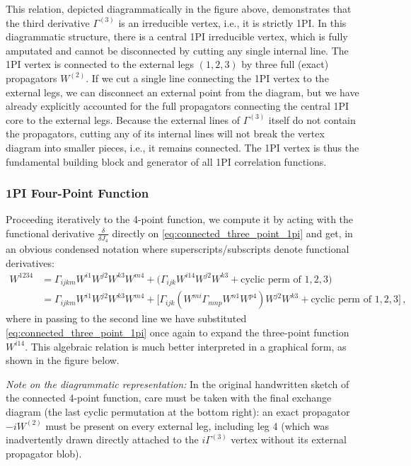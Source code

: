 This relation, depicted diagrammatically in the figure above, demonstrates that the third derivative \(\Gamma^{(3)}\) is an irreducible vertex, i.e., it is strictly 1PI. In this diagrammatic structure, there is a central 1PI irreducible vertex, which is fully amputated and cannot be disconnected by cutting any single internal line. The 1PI vertex is connected to the external legs \((1, 2, 3)\) by three full (exact) propagators \(W^{(2)}\). If we cut a single line connecting the 1PI vertex to the external legs, we can disconnect an external point from the diagram, but we have already explicitly accounted for the full propagators connecting the central 1PI core to the external legs. Because the external lines of \(\Gamma^{(3)}\) itself do not contain the propagators, cutting any of its internal lines will not break the vertex diagram into smaller pieces, i.e., it remains connected. The 1PI vertex is thus the fundamental building block and generator of all 1PI correlation functions.

\subsubsection{1PI Four-Point Function}

Proceeding iteratively to the 4-point function, we compute it by acting with the functional derivative \(\frac{\delta}{\delta J_4}\) directly on \eqref{eq:connected_three_point_1pi} and get, in an obvious condensed notation where superscripts/subscripts denote functional derivatives:
\[
    \begin{aligned}
        W^{1234} & = \Gamma_{ijkm} W^{i1} W^{j2} W^{k3} W^{m4} + \Big( \Gamma_{ijk} W^{i14} W^{j2} W^{k3} + \text{cyclic perm of } 1, 2, 3 \Big)                                               \\
                 & = \Gamma_{ijkm} W^{i1} W^{j2} W^{k3} W^{m4} + \Big[ \Gamma_{ijk} \left( W^{mi} \Gamma_{mnp} W^{n1} W^{p4} \right) W^{j2} W^{k3} + \text{cyclic perm of } 1, 2, 3 \Big] \, ,
    \end{aligned}
\]
where in passing to the second line we have substituted \eqref{eq:connected_three_point_1pi} once again to expand the three-point function \(W^{i14}\). This algebraic relation is much better interpreted in a graphical form, as shown in the figure below.


\textit{Note on the diagrammatic representation:} In the original handwritten sketch of the connected 4-point function, care must be taken with the final exchange diagram (the last cyclic permutation at the bottom right): an exact propagator \(-iW^{(2)}\) must be present on every external leg, including leg 4 (which was inadvertently drawn directly attached to the \(i\Gamma^{(3)}\) vertex without its external propagator blob).

